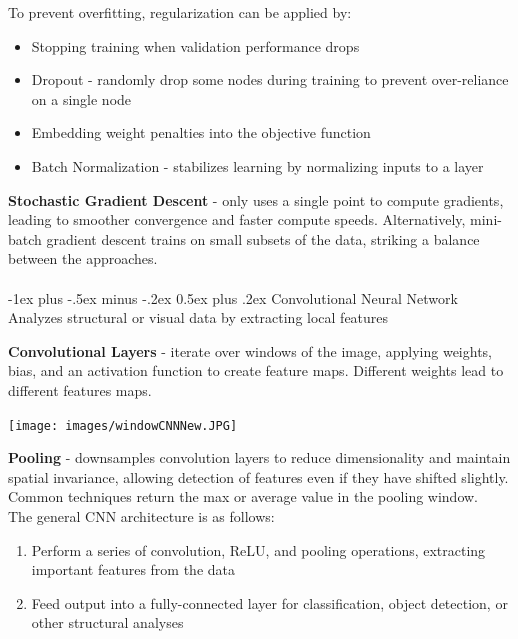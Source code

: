\documentclass[10pt,landscape]{article}
\makeatletter
\renewcommand{\section}{\@startsection{section}{1}{0mm}%
                                {-1ex plus -.5ex minus -.2ex}%
                                {0.5ex plus .2ex}%
                                {\normalfont\large\bfseries}}
\makeatother
\begin{document}
\begin{multicols}{3}
To prevent overfitting, regularization can be applied by:
\begin{itemize}[label={--},leftmargin=4mm]
\itemsep -.4mm
\item Stopping training when validation performance drops
\item Dropout - randomly drop some nodes during training to prevent over-reliance on a single node
\item Embedding weight penalties into the objective function
\item Batch Normalization - stabilizes learning by normalizing inputs to a layer
\end{itemize}
\textbf{Stochastic Gradient Descent} - only uses a single point to compute gradients, leading to smoother convergence and faster compute speeds. Alternatively, mini-batch gradient descent trains on small subsets of the data, striking a balance between the approaches.
\\

\columnbreak
\textcolor{white}{.}\vspace{-5mm}\\ %
\section{Convolutional Neural Network}
Analyzes structural or visual data by extracting local features

\textbf{Convolutional Layers} - iterate over windows of the image, applying weights, bias, and an activation function to create feature maps. Different weights lead to different features maps.
\vspace{-4mm}
\begin{center}
    \texttt{[image: images/windowCNNNew.JPG]}
\end{center}
\vspace{-2mm}
\textbf{Pooling} - downsamples convolution layers to reduce dimensionality and maintain spatial invariance, allowing detection of features even if they have shifted slightly. Common techniques return the max or average value in the pooling window.\\
\smallskip
The general CNN architecture is as follows:
\begin{enumerate}[leftmargin=5mm]
\itemsep -.4mm
\item Perform a series of convolution, ReLU, and pooling operations, extracting important features from the data
\item Feed output into a fully-connected layer for classification, object detection, or other structural analyses
\end{enumerate}


\end{multicols}
\end{document}
